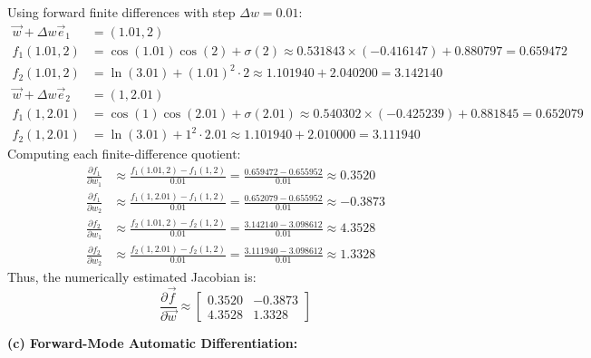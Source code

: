 \documentclass[11pt,english]{article}
\begin{document}
\begin{enumerate}[resume]
Using forward finite differences with step $\Delta w = 0.01$:
\begin{align*}
    \vec{w} + \Delta w \vec{e}_1 &= (1.01, 2) \\
    f_1(1.01, 2) &= \cos(1.01)\cos(2) + \sigma(2) \approx 0.531843 \times (-0.416147) + 0.880797 = 0.659472 \\
    f_2(1.01, 2) &= \ln(3.01) + (1.01)^2 \cdot 2 \approx 1.101940 + 2.040200 = 3.142140 \\
    \vec{w} + \Delta w \vec{e}_2 &= (1, 2.01) \\
    f_1(1, 2.01) &= \cos(1)\cos(2.01) + \sigma(2.01) \approx 0.540302 \times (-0.425239) + 0.881845 = 0.652079 \\
    f_2(1, 2.01) &= \ln(3.01) + 1^2 \cdot 2.01 \approx 1.101940 + 2.010000 = 3.111940
\end{align*}
Computing each finite-difference quotient:
\begin{align}
    \frac{\partial f_1}{\partial w_1} &\approx \frac{f_1(1.01, 2) - f_1(1, 2)}{0.01} = \frac{0.659472 - 0.655952}{0.01} \approx 0.3520 \\
    \frac{\partial f_1}{\partial w_2} &\approx \frac{f_1(1, 2.01) - f_1(1, 2)}{0.01} = \frac{0.652079 - 0.655952}{0.01} \approx -0.3873 \\
    \frac{\partial f_2}{\partial w_1} &\approx \frac{f_2(1.01, 2) - f_2(1, 2)}{0.01} = \frac{3.142140 - 3.098612}{0.01} \approx 4.3528 \\
    \frac{\partial f_2}{\partial w_2} &\approx \frac{f_2(1, 2.01) - f_2(1, 2)}{0.01} = \frac{3.111940 - 3.098612}{0.01} \approx 1.3328
\end{align}
Thus, the numerically estimated Jacobian is:
\begin{equation}
    \frac{\partial \vec{f}}{\partial \vec{w}} \approx \begin{bmatrix} 0.3520 & -0.3873 \\ 4.3528 & 1.3328 \end{bmatrix}
\end{equation}

\vspace{0.5em}
\textbf{(c) Forward-Mode Automatic Differentiation:}


\end{enumerate}
\end{document}

